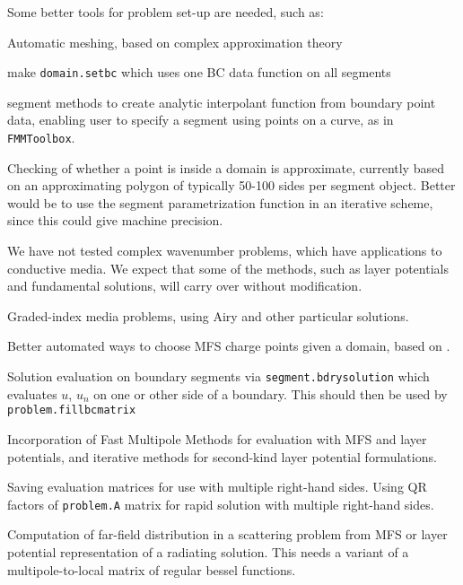 \documentclass[12pt]{article}
\begin{document}
\item Some better tools for problem set-up are needed, such as:
\bi
  \item Automatic meshing, based on complex approximation theory
  \item make {\tt domain.setbc} which uses one BC data function on all segments
  \item segment methods to create analytic interpolant function from boundary
point data, enabling user to specify a segment using points on a curve,
as in {\tt FMMToolbox}.
\ei

\item Checking of whether a point is inside a domain is approximate,
currently based on an approximating polygon of typically 50-100 sides
per segment object.
Better would be to use the segment parametrization function in
an iterative scheme, since this could give machine precision.

\item We have not tested complex wavenumber problems, which have
applications to conductive media. We expect that some of the
methods, such as layer potentials and fundamental solutions,
will carry over without modification.

\item Graded-index media problems, using Airy and other particular
solutions.

\item Better automated ways to choose MFS charge points given a domain,
based on \cite{mfs}.

\item Solution evaluation on boundary segments via {\tt segment.bdrysolution}
 which evaluates $u$, $u_n$ on one
or other side of a boundary.
This should then be used by {\tt problem.fillbcmatrix}

\item Incorporation of Fast Multipole Methods for evaluation with MFS and
layer potentials, and iterative
methods for second-kind layer potential formulations.

\item Saving
evaluation matrices for use with multiple right-hand sides.
Using QR factors of {\tt problem.A} matrix
for rapid solution with multiple right-hand sides.

\item Computation of far-field distribution in a scattering problem
from MFS or layer potential
representation of a radiating solution. This needs a variant of a
multipole-to-local matrix of regular bessel functions.
\ei
\end{document}
